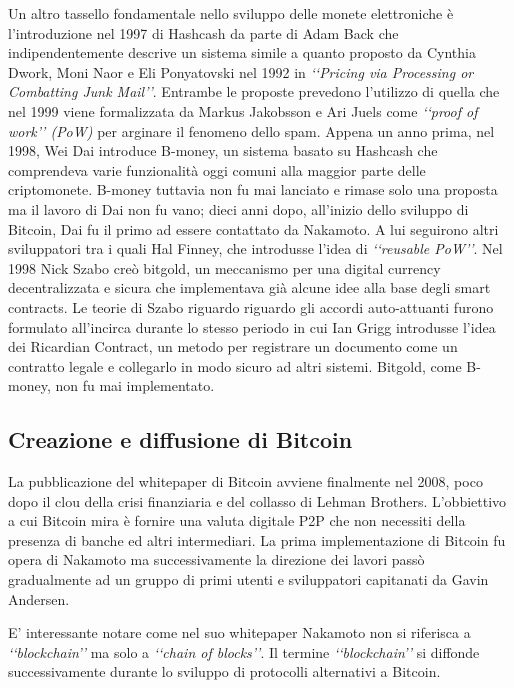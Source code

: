 Un altro tassello fondamentale nello sviluppo delle monete elettroniche è l’introduzione nel 1997 di Hashcash\cite{K9} da parte di Adam Back che indipendentemente descrive un sistema simile a quanto proposto da Cynthia Dwork,  Moni Naor e Eli Ponyatovski nel 1992 in \textit{‘‘Pricing via Processing or Combatting Junk Mail’’}\cite{K10}. Entrambe le proposte prevedono l’utilizzo di quella che nel 1999 viene formalizzata da  Markus Jakobsson e Ari Juels come \textit{‘‘proof of work’’ (PoW)} per arginare il fenomeno dello spam\cite{K11}. Appena un anno prima, nel 1998, Wei Dai introduce B-money\cite{K12}, un sistema basato su Hashcash che comprendeva varie funzionalità oggi comuni alla maggior parte delle criptomonete. B-money tuttavia non fu mai lanciato e rimase solo una proposta ma il lavoro di Dai non fu vano; dieci anni dopo, all'inizio dello sviluppo di Bitcoin, Dai fu il primo ad essere contattato da Nakamoto. A lui seguirono altri sviluppatori tra i quali Hal Finney, che introdusse l'idea di \textit{‘‘reusable PoW’’}\cite{K13}. Nel 1998 Nick Szabo creò bitgold\cite{K14}, un meccanismo per una digital currency decentralizzata e sicura che implementava già alcune idee alla base degli smart contracts. Le teorie di Szabo riguardo riguardo gli accordi auto-attuanti furono formulato all'incirca durante lo stesso periodo in cui Ian Grigg introdusse l'idea dei Ricardian Contract, un metodo per registrare un documento come un contratto legale e collegarlo in modo sicuro ad altri sistemi\cite{K15}. Bitgold, come B-money, non fu mai implementato.

\subsection{Creazione e diffusione di Bitcoin}

La pubblicazione del whitepaper di Bitcoin avviene finalmente nel 2008, poco dopo il clou della crisi finanziaria e del collasso di Lehman Brothers. L'obbiettivo a cui Bitcoin mira è fornire una valuta digitale P2P che non necessiti della presenza di banche ed altri intermediari.  La prima implementazione di Bitcoin fu opera di Nakamoto ma successivamente la direzione dei lavori passò gradualmente ad un gruppo di primi utenti e sviluppatori capitanati da Gavin Andersen. 

E' interessante notare come nel suo whitepaper\cite{K1} Nakamoto non si riferisca a \textit{‘‘blockchain’’} ma solo a \textit{‘‘chain of blocks’’}. Il termine \textit{‘‘blockchain’’} si diffonde successivamente durante lo sviluppo di protocolli alternativi a Bitcoin. 

